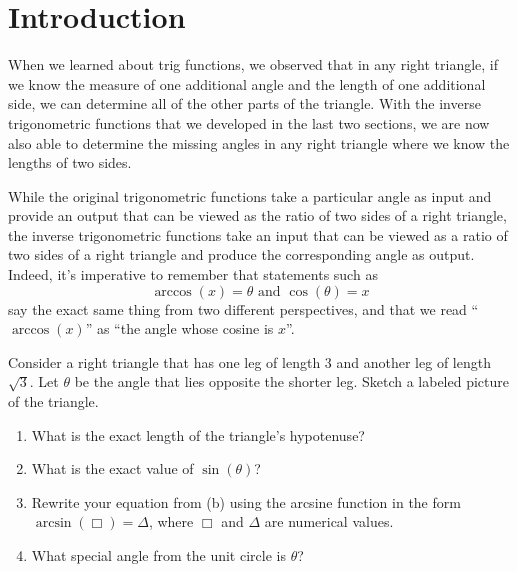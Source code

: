 \documentclass{ximera}
\begin{document}
\section{Introduction}
When we learned about trig functions, we observed that in any right triangle, if we know the measure of one additional angle and the length of one additional side, we can determine all of the other parts of the triangle.  With the inverse trigonometric functions that we developed in the last two sections, we are now also able to determine the missing angles in any right triangle where we know the lengths of two sides.%
\par
While the original trigonometric functions take a particular angle as input and provide an output that can be viewed as the ratio of two sides of a right triangle, the inverse trigonometric functions take an input that can be viewed as a ratio of two sides of a right triangle and produce the corresponding angle as output. Indeed, it's imperative to remember that statements such as%
\begin{equation*}
\arccos(x) = \theta \text{ and } \cos(\theta) = x
\end{equation*}
say the exact same thing from two different perspectives, and that we read ``$\arccos(x)$'' as ``the angle whose cosine is $x$''.%
\begin{exploration}
%
Consider a right triangle that has one leg of length $3$ and another leg of length $\sqrt{3}$.  Let $\theta$ be the angle that lies opposite the shorter leg.  Sketch a labeled picture of the triangle.%
%
\begin{enumerate}
\item What is the exact length of the triangle's hypotenuse?
%
\item What is the exact value of $\sin(\theta)$?
%
\item Rewrite your equation from (b) using the arcsine function in the form $\arcsin(\Box) = \Delta$, where $\Box$ and $\Delta$ are numerical values.
%
\item What special angle from the unit circle is $\theta$?%
\end{enumerate}
\end{exploration}
\end{document}
